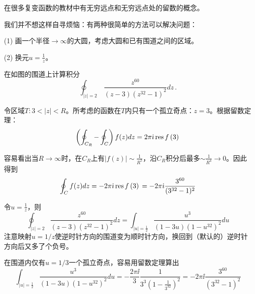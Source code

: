 \documentclass[CJK]{beamer}
\begin{document}
\begin{frame}
\bch
在很多复变函数的教材中有无穷远点和无穷远点处的留数的概念。

\skiplines

我们并不想这样自寻烦恼：有两种很简单的方法可以解决问题：
\bitem
\item[(1)]{画一个半径$\rightarrow \infty$的大圆，考虑大圆和已有围道之间的区域。}
\item[(2)]{换元$u=\frac{1}{z}$。}
\eitem
\ech
\end{frame}

\begin{frame}
\chtitle{\proid (\stwo)}
\bch
{}
在如图的围道上计算积分
$$\oint_{|z|=2}\,\frac{z^{60}}{(z-3)\left(z^{32}-1\right)^2} dz\,. $$
\ech
\end{frame}

\begin{frame}
\bch
{}

令区域$T: 3<|z|<R$。所考虑的函数在$T$内只有一个孤立奇点：$z=3$。根据留数定理：
$$\left(\oint_{C_R} - \oint_C\right) f(z) dz = 2\pi{\dot{\imath}}\,\mathrm{res}\,f\left(3\right)\, $$
\ech
\end{frame}

\begin{frame}
\bch
{}
容易看出当$R\rightarrow \infty$时，在$C_R$上有$|f(z)|\sim \frac{1}{R^5}$，沿$C_R$积分后最多$\sim \frac{1}{R^4} \rightarrow 0$。因此得到
$$ \oint_C f(z) dz  = -2\pi{\dot{\imath}} \,\mathrm{res}\,f\left(3\right)\, = -2\pi{\dot{\imath}}\frac{3^{60}}{(3^{32}-1)^2} $$
\ech
\end{frame}


\begin{frame}
\bch
令$u = \frac{1}{z}$，则
$$\oint_{|z|=2} \frac{z^{60}}{(z-3)\left(z^{32}-1\right)^2} dz = \int_{|u|=\frac{1}{2}} \frac{u^3}{(1-3u)\left(1-u^{32}\right)^2} du $$
{\scriptsize 注意映射$u=1/z$使逆时针方向的围道变为顺时针方向，换回到（默认的）逆时针方向后又多了个负号。}

在围道内仅有$u=1/3$一个孤立奇点，容易用留数定理算出
$$ \int_{|u|=\frac{1}{2}} \frac{u^3}{(1-3u)\left(1-u^{32}\right)^2} du = -\frac{2\pi\ii}{3} \frac{1}{3^3\left(1-\frac{1}{3^{32}}\right)^2} = -2\pi\ii \frac{3^{60}}{\left(3^{32}-1\right)^2} $$

\ech
\end{frame}


\end{document}
